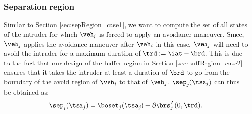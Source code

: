 \subsubsection{Separation region} \label{sec:sepRegion_case2}
Similar to Section \ref{sec:sepRegion_case1}, we want to compute the set of all states of the intruder for which $\veh_j$ is forced to apply an avoidance maneuver. Since, $\veh_j$ applies the avoidance maneuver after $\veh_i$ in this case, $\veh_j$ will need to avoid the intruder for a maximum duration of $\trd := \iat - \brd$. This is due to the fact that our design of the buffer region in Section \ref{sec:buffRegion_case2} ensures that it takes the intruder at least a duration of $\brd$ to go from the boundary of the avoid region of $\veh_i$ to that of $\veh_j$. $\sep_j(\tsa_j)$ can thus be obtained as:
\begin{equation} \label{eqn:sepRegion_case2}
\sep_j(\tsa_j) = \boset_j(\tsa_j) + \partial \brs^{\text{A}}_{j}(0, \trd).
\end{equation}


